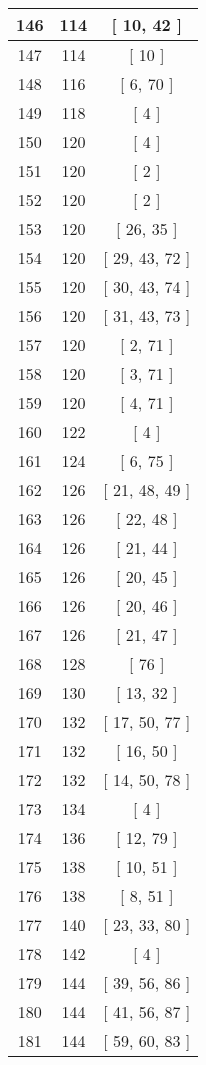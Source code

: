\begin{center}
\begin{longtable}[H]{|| c c c ||}
\hline
146 & 114 & [ 10, 42 ] \\ 
\hline
147 & 114 & [ 10 ] \\ 
\hline
148 & 116 & [ 6, 70 ] \\ 
\hline
149 & 118 & [ 4 ] \\ 
\hline
150 & 120 & [ 4 ] \\ 
\hline
151 & 120 & [ 2 ] \\ 
\hline
152 & 120 & [ 2 ] \\ 
\hline
153 & 120 & [ 26, 35 ] \\ 
\hline
154 & 120 & [ 29, 43, 72 ] \\ 
\hline
155 & 120 & [ 30, 43, 74 ] \\ 
\hline
156 & 120 & [ 31, 43, 73 ] \\ 
\hline
157 & 120 & [ 2, 71 ] \\ 
\hline
158 & 120 & [ 3, 71 ] \\ 
\hline
159 & 120 & [ 4, 71 ] \\ 
\hline
160 & 122 & [ 4 ] \\ 
\hline
161 & 124 & [ 6, 75 ] \\ 
\hline
162 & 126 & [ 21, 48, 49 ] \\ 
\hline
163 & 126 & [ 22, 48 ] \\ 
\hline
164 & 126 & [ 21, 44 ] \\ 
\hline
165 & 126 & [ 20, 45 ] \\ 
\hline
166 & 126 & [ 20, 46 ] \\ 
\hline
167 & 126 & [ 21, 47 ] \\ 
\hline
168 & 128 & [ 76 ] \\ 
\hline
169 & 130 & [ 13, 32 ] \\ 
\hline
170 & 132 & [ 17, 50, 77 ] \\ 
\hline
171 & 132 & [ 16, 50 ] \\ 
\hline
172 & 132 & [ 14, 50, 78 ] \\ 
\hline
173 & 134 & [ 4 ] \\ 
\hline
174 & 136 & [ 12, 79 ] \\ 
\hline
175 & 138 & [ 10, 51 ] \\ 
\hline
176 & 138 & [ 8, 51 ] \\ 
\hline
177 & 140 & [ 23, 33, 80 ] \\ 
\hline
178 & 142 & [ 4 ] \\ 
\hline
179 & 144 & [ 39, 56, 86 ] \\ 
\hline
180 & 144 & [ 41, 56, 87 ] \\ 
\hline
181 & 144 & [ 59, 60, 83 ] \\ 

\end{longtable}
\end{center}
